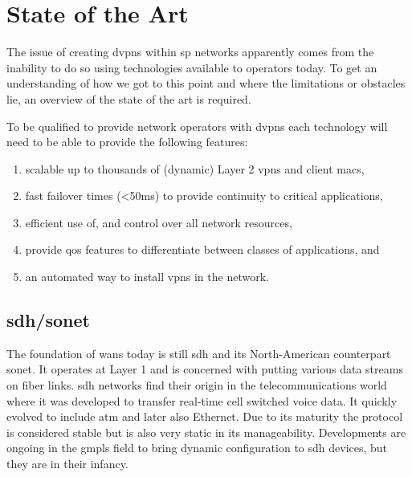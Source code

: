 \section{State of the Art} %
\label{sec:state_of_the_art}

The issue of creating \acp{dvpn} within \ac{sp} networks apparently comes from the inability to do so using technologies available to operators today. To get an understanding of how we got to this point and where the limitations or obstacles lie, an overview of the state of the art is required.

To be qualified to provide network operators with \acp{dvpn} each technology will need to be able to provide the following features:

\begin{enumerate}
	\item scalable up to thousands of (dynamic) Layer 2 \acp{vpn} and client \acsp{mac},
	\item fast failover times (<50ms) to provide continuity to critical applications,
	\item efficient use of, and control over all network resources,
	\item provide \acl{qos} features to differentiate between classes of applications, and
	\item an automated way to install \acp{vpn} in the network.
\end{enumerate}

\subsection{\acs{sdh}/\acs{sonet}} %
\label{sub:sdh_sonet}
The foundation of \acp{wan} today is still \ac{sdh} and its North-American counterpart \ac{sonet}. It operates at Layer 1 and is concerned with putting various data streams on fiber links. \ac{sdh} networks find their origin in the telecommunications world where it was developed to transfer real-time cell switched voice data. It quickly evolved to include \ac{atm} and later also Ethernet. Due to its maturity the protocol is considered stable but is also very static in its manageability. Developments are ongoing in the \ac{gmpls} field to bring dynamic configuration to \ac{sdh} devices, but they are in their infancy.


